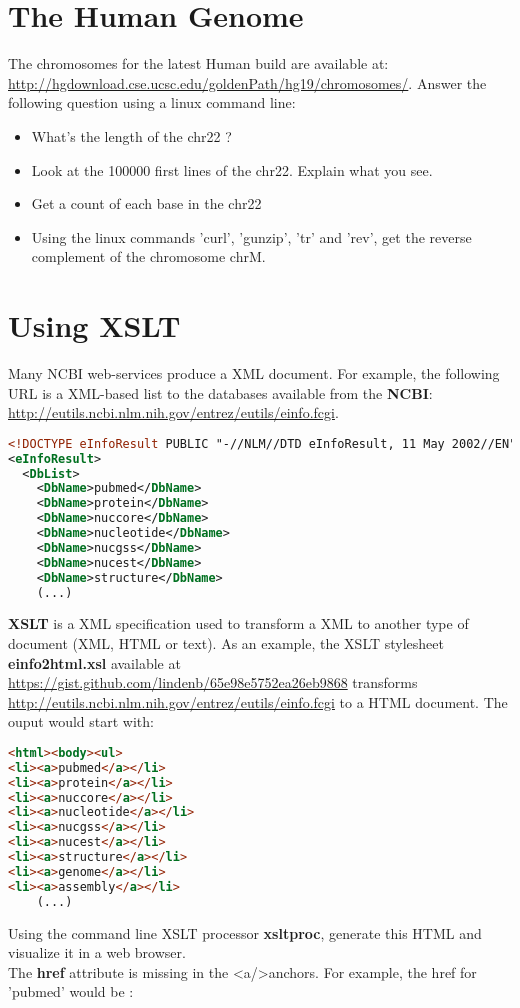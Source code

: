 \documentclass{article}
\begin{document}
\section{The Human Genome}

The chromosomes for the latest Human build are available at: \url{http://hgdownload.cse.ucsc.edu/goldenPath/hg19/chromosomes/}. Answer the following question using a linux command line:
\begin{itemize}
\item What's the length of the chr22 ?
\item Look at the 100000 first lines of the chr22. Explain what you see.
\item Get a count of each base in the chr22
\item Using the linux commands 'curl', 'gunzip', 'tr' and 'rev', get the reverse complement of the chromosome chrM.
\end{itemize}


\section{Using XSLT}
Many NCBI web-services produce a XML document. For example, the following URL is a XML-based list to the databases available from the  \textbf{NCBI}: \url{http://eutils.ncbi.nlm.nih.gov/entrez/eutils/einfo.fcgi}.\\
\begin{lstlisting}[language=xml]
<!DOCTYPE eInfoResult PUBLIC "-//NLM//DTD eInfoResult, 11 May 2002//EN" "http://www.ncbi.nlm.nih.gov/entrez/query/DTD/eInfo_020511.dtd">
<eInfoResult>
  <DbList>
    <DbName>pubmed</DbName>
    <DbName>protein</DbName>
    <DbName>nuccore</DbName>
    <DbName>nucleotide</DbName>
    <DbName>nucgss</DbName>
    <DbName>nucest</DbName>
    <DbName>structure</DbName>
    (...)
\end{lstlisting}
\textbf{XSLT} is a XML specification used to transform a XML to another type of document (XML, HTML or text).
As an example, the XSLT stylesheet \textbf{einfo2html.xsl} available at \url{https://gist.github.com/lindenb/65e98e5752ea26eb9868} transforms  \url{http://eutils.ncbi.nlm.nih.gov/entrez/eutils/einfo.fcgi} to a HTML document. The ouput would start with:\\
\begin{lstlisting}[language=html]
<html><body><ul>
<li><a>pubmed</a></li>
<li><a>protein</a></li>
<li><a>nuccore</a></li>
<li><a>nucleotide</a></li>
<li><a>nucgss</a></li>
<li><a>nucest</a></li>
<li><a>structure</a></li>
<li><a>genome</a></li>
<li><a>assembly</a></li>
    (...)
\end{lstlisting} 
\noindent
Using the command line XSLT processor \textbf{xsltproc}, generate this HTML and visualize it in a web browser.\\
The \textbf{href} attribute is missing in the \textless{}a/\textgreater  anchors. For example, the href for 'pubmed' would be :
\end{document}
